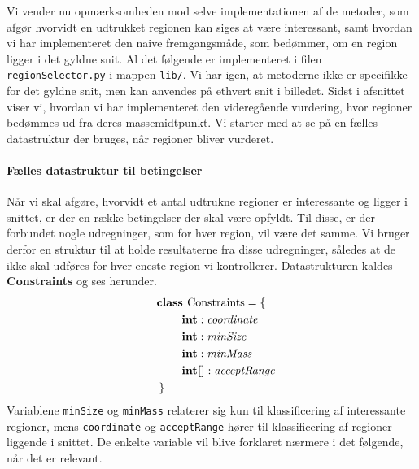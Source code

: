 {
{\sffamily Vi vender nu opmærksomheden mod selve implementationen af de
metoder, som afgør hvorvidt en udtrukket regionen kan siges at være
interessant, samt hvordan vi har implementeret den naive fremgangsmåde,
som bedømmer, om en region ligger i det gyldne snit. Al det følgende er
implementeret i filen \texttt{regionSelector.py} i mappen \texttt{lib/}.
Vi har igen, at metoderne ikke er specifikke for det gyldne snit, men
kan anvendes på ethvert snit i billedet. Sidst i afsnittet viser vi,
hvordan vi har implementeret den videregående vurdering, hvor regioner
bedømmes ud fra deres massemidtpunkt. Vi starter med at se på en fælles
datastruktur der bruges, når regioner bliver vurderet.
}

\paragraph{Fælles datastruktur til betingelser}
Når vi skal afgøre, hvorvidt et antal udtrukne regioner er interessante
og ligger i snittet, er der en række betingelser der skal være opfyldt.
Til disse, er der forbundet nogle udregninger, som for hver region, vil
være det samme. Vi bruger derfor en struktur til at holde resultaterne
fra disse udregninger, således at de ikke skal udføres for hver eneste
region vi kontrollerer. Datastrukturen kaldes \textbf{Constraints} og
ses herunder.
\begin{multline}
    \textbf{class~} \textrm{Constraints} = \{ \\
    \shoveleft{\qquad\textbf{int} : \textit{coordinate}} \\
    \shoveleft{\qquad\textbf{int} : \textit{minSize}} \\
    \shoveleft{\qquad\textbf{int} : \textit{minMass}} \\
    \shoveleft{\qquad\textbf{int[]} : \textit{acceptRange}} \\
    \shoveleft{\}}\shoveright{}
    \label{Constraints_class}
\end{multline}
Variablene \texttt{minSize} og \texttt{minMass} relaterer sig kun til
klassificering af interessante regioner, mens \texttt{coordinate} og
\texttt{acceptRange} hører til klassificering af regioner liggende i
snittet. De enkelte variable vil blive forklaret nærmere i det følgende,
når det er relevant.

}
